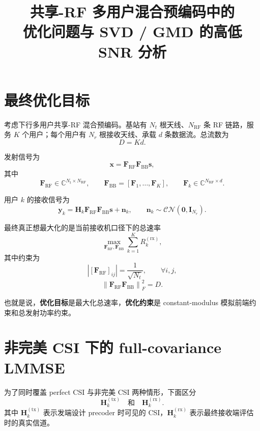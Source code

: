 \documentclass[11pt]{ctexart}
\title{共享-RF 多用户混合预编码中的\\优化问题与 SVD / GMD 的高低 SNR 分析}
\author{}
\date{}
\newcommand{\Id}{\bm{I}}
\newcommand{\CN}{\mathcal{CN}}
\begin{document}
\maketitle

\section{最终优化目标}
考虑下行多用户共享-RF 混合预编码。基站有 $N_t$ 根天线、$N_{\mathrm{RF}}$ 条 RF 链路，服务 $K$ 个用户；每个用户有 $N_r$ 根接收天线、承载 $d$ 条数据流。总流数为
\begin{equation}
    D=Kd.
\end{equation}

发射信号为
\begin{equation}
    \bm{x}
    =
    \bm{F}_{\mathrm{RF}}\bm{F}_{\mathrm{BB}}\bm{s},
\end{equation}
其中
\begin{equation}
    \bm{F}_{\mathrm{RF}}\in\mathbb{C}^{N_t\times N_{\mathrm{RF}}},
    \qquad
    \bm{F}_{\mathrm{BB}}
    =
    \left[
        \bm{F}_1,\ldots,\bm{F}_K
    \right],
    \qquad
    \bm{F}_k\in\mathbb{C}^{N_{\mathrm{RF}}\times d}.
\end{equation}

用户 $k$ 的接收信号为
\begin{equation}
    \bm{y}_k
    =
    \bm{H}_k\bm{F}_{\mathrm{RF}}\bm{F}_{\mathrm{BB}}\bm{s}
    +
    \bm{n}_k,
    \qquad
    \bm{n}_k\sim\CN(\bm{0},\Id_{N_r}).
\end{equation}

最终真正想最大化的是当前接收机口径下的总速率
\begin{equation}
    \max_{\bm{F}_{\mathrm{RF}},\bm{F}_{\mathrm{BB}}}
    \sum_{k=1}^{K} R_k^{(\mathrm{rx})},
\end{equation}
其中约束为
\begin{equation}
    \left|[\bm{F}_{\mathrm{RF}}]_{ij}\right|
    =
    \frac{1}{\sqrt{N_t}},
    \qquad
    \forall i,j,
\end{equation}
\begin{equation}
    \left\|
        \bm{F}_{\mathrm{RF}}\bm{F}_{\mathrm{BB}}
    \right\|_F^2
    =
    D.
\end{equation}

也就是说，\textbf{优化目标}是最大化总速率，\textbf{优化约束}是 constant-modulus 模拟前端约束和总发射功率约束。

\section{非完美 CSI 下的 full-covariance LMMSE}
为了同时覆盖 perfect CSI 与非完美 CSI 两种情形，下面区分
\begin{equation}
    \bm{H}_k^{(\mathrm{tx})}
    \quad\text{和}\quad
    \bm{H}_k^{(\mathrm{rx})}.
\end{equation}
其中 $\bm{H}_k^{(\mathrm{tx})}$ 表示发端设计 precoder 时可见的 CSI，$\bm{H}_k^{(\mathrm{rx})}$ 表示最终接收端评估时的真实信道。
\end{document}
